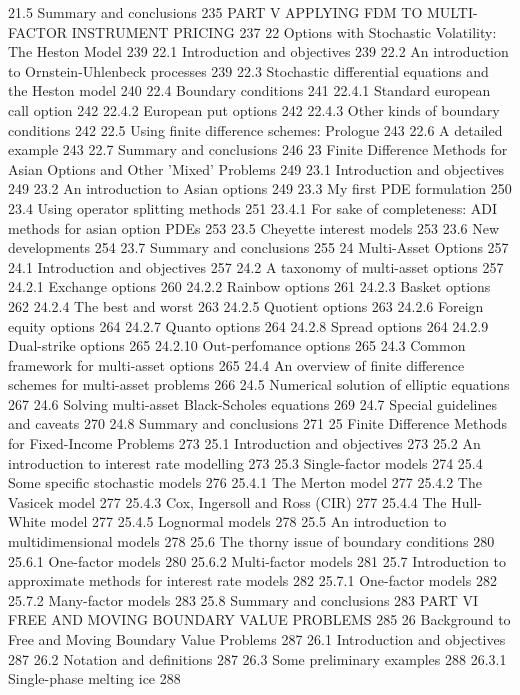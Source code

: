21.5 Summary and conclusions 235
PART V APPLYING FDM TO MULTI-FACTOR INSTRUMENT PRICING 237
22 Options with Stochastic Volatility: The Heston Model 239
22.1 Introduction and objectives 239
22.2 An introduction to Ornstein-Uhlenbeck processes 239
22.3 Stochastic differential equations and the Heston model 240
22.4 Boundary conditions 241
22.4.1 Standard european call option 242
22.4.2 European put options 242
22.4.3 Other kinds of boundary conditions 242
22.5 Using finite difference schemes: Prologue 243
22.6 A detailed example 243
22.7 Summary and conclusions 246
23 Finite Difference Methods for Asian Options and Other 'Mixed' Problems 249
23.1 Introduction and objectives 249
23.2 An introduction to Asian options 249
23.3 My first PDE formulation 250
23.4 Using operator splitting methods 251
23.4.1 For sake of completeness: ADI methods for asian option PDEs 253
23.5 Cheyette interest models 253
23.6 New developments 254
23.7 Summary and conclusions 255
24 Multi-Asset Options 257
24.1 Introduction and objectives 257
24.2 A taxonomy of multi-asset options 257
24.2.1 Exchange options 260
24.2.2 Rainbow options 261
24.2.3 Basket options 262
24.2.4 The best and worst 263
24.2.5 Quotient options 263
24.2.6 Foreign equity options 264
24.2.7 Quanto options 264
24.2.8 Spread options 264
24.2.9 Dual-strike options 265
24.2.10 Out-perfomance options 265
24.3 Common framework for multi-asset options 265
24.4 An overview of finite difference schemes for multi-asset problems 266
24.5 Numerical solution of elliptic equations 267
24.6 Solving multi-asset Black-Scholes equations 269
24.7 Special guidelines and caveats 270
24.8 Summary and conclusions 271
25 Finite Difference Methods for Fixed-Income Problems 273
25.1 Introduction and objectives 273
25.2 An introduction to interest rate modelling 273
25.3 Single-factor models 274
25.4 Some specific stochastic models 276
25.4.1 The Merton model 277
25.4.2 The Vasicek model 277
25.4.3 Cox, Ingersoll and Ross (CIR) 277
25.4.4 The Hull-White model 277
25.4.5 Lognormal models 278
25.5 An introduction to multidimensional models 278
25.6 The thorny issue of boundary conditions 280
25.6.1 One-factor models 280
25.6.2 Multi-factor models 281
25.7 Introduction to approximate methods for interest rate models 282
25.7.1 One-factor models 282
25.7.2 Many-factor models 283
25.8 Summary and conclusions 283
PART VI FREE AND MOVING BOUNDARY VALUE PROBLEMS 285
26 Background to Free and Moving Boundary Value Problems 287
26.1 Introduction and objectives 287
26.2 Notation and definitions 287
26.3 Some preliminary examples 288
26.3.1 Single-phase melting ice 288
